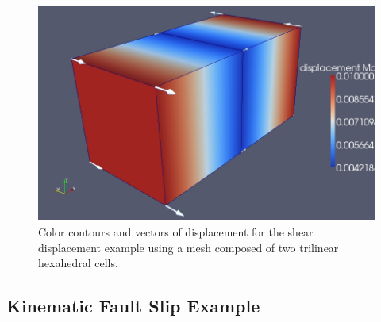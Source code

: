 \begin{figure}
\begin{centering}
\includegraphics[scale=0.33]{tutorials/twocells/figs/twohex8-sheardisp}
\par\end{centering}

\caption{Color contours and vectors of displacement for the shear displacement
example using a mesh composed of two trilinear hexahedral cells.\label{fig:twohex8-shear}}


\end{figure}



\subsection{Kinematic Fault Slip Example}

